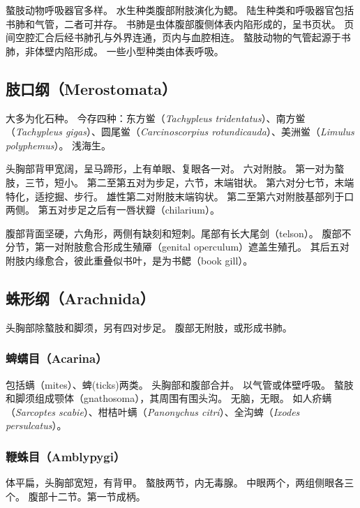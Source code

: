 \documentclass[11pt]{article}
\begin{document}
\newline

螯肢动物呼吸器官多样。
水生种类腹部附肢演化为鳃。
陆生种类和呼吸器官包括书肺和气管，二者可并存。
书肺是虫体腹部腹侧体表内陷形成的，呈书页状。
页间空腔汇合后经书肺孔与外界连通，页内与血腔相连。
螯肢动物的气管起源于书肺，非体壁内陷形成。
一些小型种类由体表呼吸。

\subsection{肢口纲（Merostomata）}
大多为化石种。
今存四种：东方鲎（\textit{Tachypleus tridentatus}）、南方鲎（\textit{Tachypleus gigas}）、圆尾鲎（\textit{Carcinoscorpius rotundicauda}）、美洲鲎（\textit{Limulus polyphemus}）。
浅海生。

\newline

头胸部背甲宽阔，呈马蹄形，上有单眼、复眼各一对。
六对附肢。
第一对为螯肢，三节，短小。
第二至第五对为步足，六节，末端钳状。
第六对分七节，末端特化，适挖掘、步行。
雄性第二对附肢末端钩状。
第二至第六对附肢基部列于口两侧。
第五对步足之后有一唇状瓣（chilarium）。

\newline

腹部背面坚硬，六角形，两侧有缺刻和短刺。尾部有长大尾剑（telson）。
腹部不分节，第一对附肢愈合形成生殖厣（genital operculum）遮盖生殖孔。
其后五对附肢内缘愈合，彼此重叠似书叶，是为书鳃（book gill）。

\subsection{蛛形纲（Arachnida）}
头胸部除螯肢和脚须，另有四对步足。
腹部无附肢，或形成书肺。

\subsubsection{蜱螨目（Acarina）}
包括螨（mites）、蜱(ticks)两类。
头胸部和腹部合并。
以气管或体壁呼吸。
螯肢和脚须组成颚体（gnathosoma），其周围有围头沟。
无脑，无眼。
如人疥螨（\textit{Sarcoptes scabie}）、柑桔叶螨（\textit{Panonychus citri}）、全沟蜱（\textit{Ixodes persulcatus}）。

\subsubsection{鞭蛛目（Amblypygi）}
体平扁，头胸部宽短，有背甲。
螯肢两节，内无毒腺。
中眼两个，两组侧眼各三个。
腹部十二节。第一节成柄。
\end{document}
